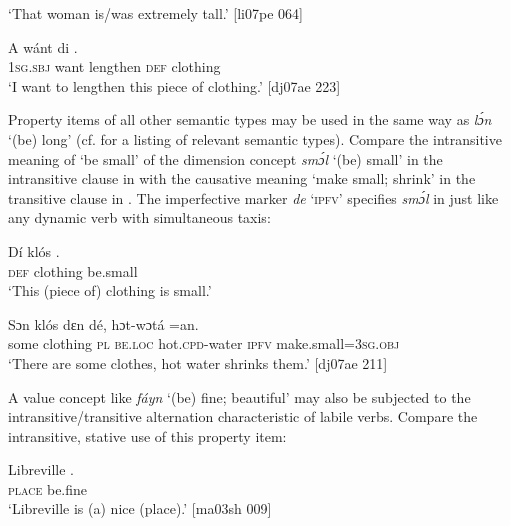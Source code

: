 \glt ‘That woman is/was extremely tall.’ [li07pe 064]
\z


\ea%
    \label{ex:key:1117}
    \gll \MakeUppercase{A}   wánt        di  .\\
\textsc{1sg.sbj}  want  lengthen    \textsc{def}  clothing\\

\glt ‘I want to lengthen this piece of clothing.’ [dj07ae 223]
\z

Property items of all other semantic types may be used in the same way as \textit{lɔ́n} ‘(be) long’ (cf.  for a listing of relevant semantic types). Compare the intransitive meaning of ‘be small’ of the dimension concept \textit{smɔ́l} ‘(be) small’ in the intransitive clause in  with the causative meaning ‘make small; shrink’ in the transitive clause in . The imperfective marker \textit{de} ‘\textsc{ipfv}’ specifies \textit{smɔ́l} in  just like any dynamic verb with simultaneous taxis:


\ea%
    \label{ex:key:1118}
    \gll Dí  klós    .\\
\textsc{def}  clothing  be.small\\

\glt ‘This (piece of) clothing is small.’
\z


\ea%
    \label{ex:key:1119}
    \gll Sɔn    klós    dɛn  dé,    hɔt-wɔtá        =an.\\
some  clothing  \textsc{pl}  \textsc{be.loc}  hot.\textsc{cpd}{}-water    \textsc{ipfv}  make.small=\textsc{3sg.obj}\\

\glt ‘There are some clothes, hot water shrinks them.’ [dj07ae 211]
\z

A value concept like \textit{fáyn} ‘(be) fine; beautiful’ may also be subjected to the intransitive/transitive alternation characteristic of labile verbs. Compare the intransitive, stative use of this property item: 


\ea%
    \label{ex:key:1120}
    \gll Libreville  .\\
\textsc{place}    be.fine\\

\glt ‘Libreville is (a) nice (place).’ [ma03sh 009]
\z

